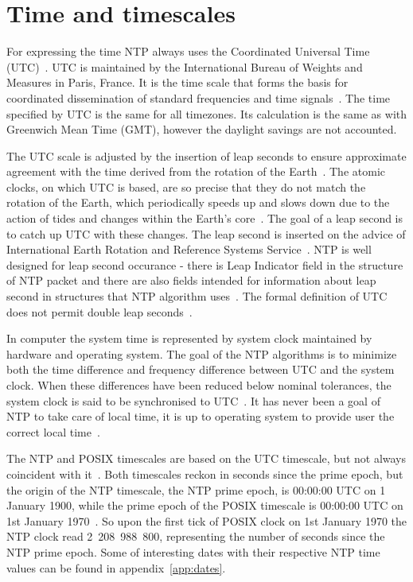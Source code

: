 
\section{Time and timescales}\label{sec:ntp-time}
For expressing the time NTP always uses the Coordinated Universal Time (UTC)~\cite{rfc5905}.
UTC is maintained by the International Bureau of Weights and Measures in Paris, France.
It is the time scale that forms the basis for coordinated dissemination
of standard frequencies and time signals~\cite{bipm-utc}.
The time specified by UTC is the same for all timezones.
Its calculation is the same as with Greenwich Mean Time (GMT),
however the daylight savings are not accounted.

The UTC scale is adjusted by the insertion of leap seconds to ensure approximate
agreement with the time derived from the rotation of the Earth~\cite{bipm-utc}.
The atomic clocks, on which UTC is based, are so precise that
they do not match the rotation of the Earth,
which periodically speeds up and slows down due to the action
of tides and changes within the Earth's core~\cite{cnn-earth}.
The goal of a leap second is to catch up UTC with these changes.
The leap second is inserted on the advice of International Earth Rotation and Reference Systems Service~\cite{bipm-utc}.
NTP is well designed for leap second occurance -
there is Leap Indicator field
in the structure of NTP packet and there are also fields intended for
information about leap second in structures that NTP algorithm uses~\cite{rfc5905}.
The formal definition of UTC does not permit double leap seconds~\cite{posix}.

In computer the system time is represented by system clock maintained by
hardware and operating system.
The goal of the NTP algorithms is to minimize
both the time difference and frequency difference between UTC and the system clock.
When these differences have been reduced below nominal
tolerances, the system clock is said to be synchronised to UTC~\cite{rfc5905}.
It has never been a goal of NTP to take care of local time,
it is up to operating system to provide user the correct local time~\cite{ntp-overview}.

The NTP and POSIX timescales are based on the UTC timescale,
but not always coincident with it~\cite{ntp-leap}.
Both timescales reckon in seconds since the prime epoch,
but the origin of the NTP timescale, the NTP prime epoch, is 00:00:00 UTC on 1 January 1900,
while the prime epoch of the POSIX timescale is 00:00:00 UTC on 1st January 1970~\cite{ntp-leap}.
So upon the first tick of POSIX clock on 1st January 1970 the NTP clock read 2~208~988~800,
representing the number of seconds since the NTP prime epoch.
Some of interesting dates with their respective NTP time values
can be found in appendix~\ref{app:dates}.

